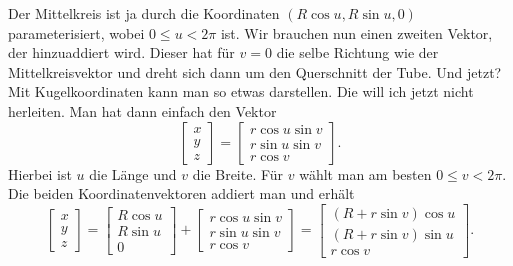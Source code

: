 \documentclass[a4paper,12pt,fleqn]{article}
\begin{document}
Der Mittelkreis ist ja durch die Koordinaten \((R\cos u,R\sin u,0)\)
parameterisiert, wobei \(0\le u<2\pi\) ist. Wir brauchen nun
einen zweiten Vektor, der hinzuaddiert wird. Dieser hat für \(v=0\)
die selbe Richtung wie der Mittelkreisvektor und dreht sich dann um
den Querschnitt der Tube. Und jetzt? Mit Kugelkoordinaten kann man
so etwas darstellen. Die will ich jetzt nicht herleiten. Man hat
dann einfach den Vektor
\begin{equation}
\begin{bmatrix}
x\\ y\\ z
\end{bmatrix}
= \begin{bmatrix}
r\cos u\sin v\\
r\sin u\sin v\\
r\cos v
\end{bmatrix}.
\end{equation}
Hierbei ist \(u\) die Länge und \(v\) die Breite. Für \(v\) wählt man
am besten \(0\le v<2\pi\). Die beiden Koordinatenvektoren addiert man
und erhält
\begin{equation}\label{Torus}
\begin{bmatrix}
x\\ y\\ z
\end{bmatrix}
= \begin{bmatrix}
R\cos u\\
R\sin u\\
0
\end{bmatrix}+\begin{bmatrix}
r\cos u\sin v\\
r\sin u\sin v\\
r\cos v
\end{bmatrix}
= \begin{bmatrix}
(R+r\sin v)\cos u\\
(R+r\sin v)\sin u\\
r\cos v
\end{bmatrix}.
\end{equation}
\end{document}
